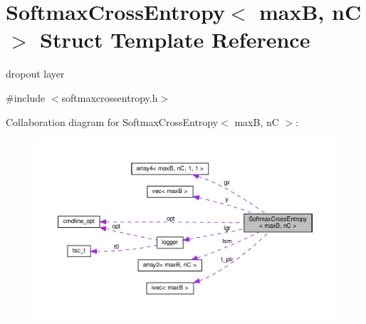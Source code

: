 \hypertarget{structSoftmaxCrossEntropy}{}\section{Softmax\+Cross\+Entropy$<$ maxB, nC $>$ Struct Template Reference}
\label{structSoftmaxCrossEntropy}


dropout layer  




{\ttfamily \#include $<$softmaxcrossentropy.\+h$>$}



Collaboration diagram for Softmax\+Cross\+Entropy$<$ maxB, nC $>$\+:\nopagebreak
\begin{figure}[H]
\begin{center}
\leavevmode
\includegraphics[width=350pt]{structSoftmaxCrossEntropy__coll__graph}
\end{center}
\end{figure}
